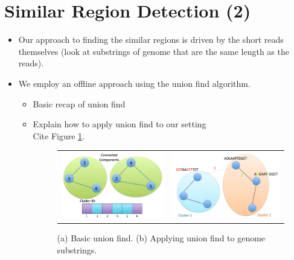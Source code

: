 \documentclass[10pt, conference, compsocconf]{IEEEtran}
\begin{document}
\section{Similar Region Detection (2)}

\begin{itemize}
\item{Our approach to finding the similar regions is driven by the short reads themselves (look at substrings of genome that are the same length as the reads).}
\item{We employ an offline approach using the union find algorithm.}
\begin{itemize}
\item{Basic recap of union find}
\item{Explain how to apply union find to our setting}\\
Cite Figure \ref{fig:unionFind}.

\begin{figure}
\centering
\begin{tabular}{c c}
\includegraphics[scale=0.25]{basicUnionFind} & \includegraphics[scale=0.25]{applyingUnionFind}
\end{tabular}
\caption{(a) Basic union find.  (b)  Applying union find to genome substrings.}
\label{fig:unionFind}
\end{figure}


\end{itemize}
\end{itemize}
\end{document}

